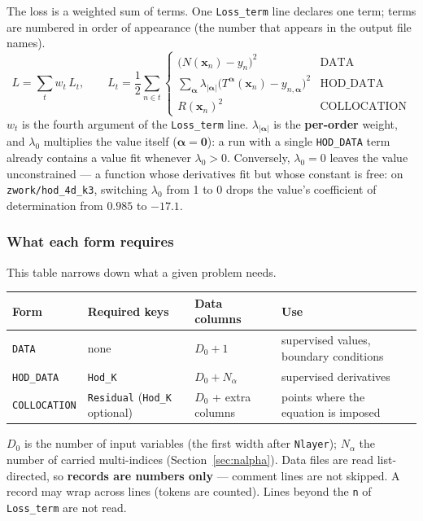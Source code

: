 \documentclass[10pt,a4paper]{article}
\newcommand{\code}[1]{\texttt{#1}}
\newcommand{\mi}[1]{\boldsymbol{#1}}
\begin{document}
The loss is a weighted sum of terms. One \code{Loss\_term} line
declares one term; terms are numbered in order of appearance (the
number that appears in the output file names).
\[
L=\sum_{t} w_t\, L_t,\qquad
L_t=\frac{1}{2}\sum_{n\in t}\begin{cases}
\big(N(\mi{x}_n)-y_n\big)^2 & \text{DATA}\\[2pt]
\displaystyle\sum_{\mi\alpha}\lambda_{|\mi\alpha|}\big(T^{\mi\alpha}(\mi{x}_n)-y_{n,\mi\alpha}\big)^2 & \text{HOD\_DATA}\\[2pt]
R(\mi{x}_n)^2 & \text{COLLOCATION}
\end{cases}
\]
$w_t$ is the fourth argument of the \code{Loss\_term} line.
$\lambda_{|\mi\alpha|}$ is the \textbf{per-order} weight, and
$\lambda_0$ multiplies the value itself ($\mi\alpha=\mi 0$): a run
with a single \code{HOD\_DATA} term already contains a value fit
whenever $\lambda_0>0$. Conversely, $\lambda_0=0$ leaves the value
unconstrained --- a function whose derivatives fit but whose constant
is free: on \code{zwork/hod\_4d\_k3}, switching $\lambda_0$ from 1 to
0 drops the value's coefficient of determination from $0.985$ to
$-17.1$.

\subsubsection{What each form requires}

This table narrows down what a given problem needs.

\begin{center}
\begin{tabular}{@{}llll@{}}
\toprule
Form & Required keys & Data columns & Use \\
\midrule
\code{DATA} & none & $D_0+1$ & supervised values, boundary conditions \\
\code{HOD\_DATA} & \code{Hod\_K} & $D_0+N_\alpha$ & supervised derivatives \\
\code{COLLOCATION} & \code{Residual} (\code{Hod\_K} optional) & $D_0$ + extra columns & points where the equation is imposed \\
\bottomrule
\end{tabular}
\end{center}

$D_0$ is the number of input variables (the first width after
\code{Nlayer}); $N_\alpha$ the number of carried multi-indices
(Section~\ref{sec:nalpha}). Data files are read list-directed, so
\textbf{records are numbers only} --- comment lines are not skipped.
A record may wrap across lines (tokens are counted). Lines beyond the
\code{n} of \code{Loss\_term} are not read.
\end{document}
